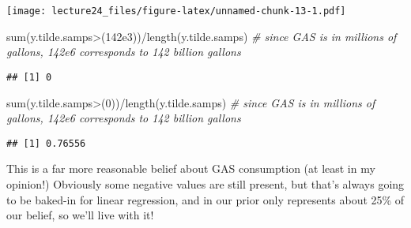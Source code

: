 \documentclass[
]{article}
\newenvironment{Shaded}{\begin{snugshade}}{\end{snugshade}}
\newcommand{\CommentTok}[1]{\textcolor[rgb]{0.56,0.35,0.01}{\textit{#1}}}
\newcommand{\DecValTok}[1]{\textcolor[rgb]{0.00,0.00,0.81}{#1}}
\newcommand{\FloatTok}[1]{\textcolor[rgb]{0.00,0.00,0.81}{#1}}
\newcommand{\FunctionTok}[1]{\textcolor[rgb]{0.00,0.00,0.00}{#1}}
\newcommand{\NormalTok}[1]{#1}
\newcommand{\SpecialCharTok}[1]{\textcolor[rgb]{0.00,0.00,0.00}{#1}}
\begin{document}
\texttt{[image: lecture24\_files/figure-latex/unnamed-chunk-13-1.pdf]}

\begin{Shaded}
\begin{Highlighting}[]
\FunctionTok{sum}\NormalTok{(y.tilde.samps}\SpecialCharTok{\textgreater{}}\NormalTok{(}\FloatTok{142e3}\NormalTok{))}\SpecialCharTok{/}\FunctionTok{length}\NormalTok{(y.tilde.samps) }\CommentTok{\# since GAS is in millions of gallons, 142e6 corresponds to 142 billion gallons}
\end{Highlighting}
\end{Shaded}

\begin{verbatim}
## [1] 0
\end{verbatim}

\begin{Shaded}
\begin{Highlighting}[]
\FunctionTok{sum}\NormalTok{(y.tilde.samps}\SpecialCharTok{\textgreater{}}\NormalTok{(}\DecValTok{0}\NormalTok{))}\SpecialCharTok{/}\FunctionTok{length}\NormalTok{(y.tilde.samps) }\CommentTok{\# since GAS is in millions of gallons, 142e6 corresponds to 142 billion gallons}
\end{Highlighting}
\end{Shaded}

\begin{verbatim}
## [1] 0.76556
\end{verbatim}

This is a far more reasonable belief about GAS consumption (at least in
my opinion!) Obviously some negative values are still present, but
that's always going to be baked-in for linear regression, and in our
prior only represents about 25\% of our belief, so we'll live with it!
\end{document}
